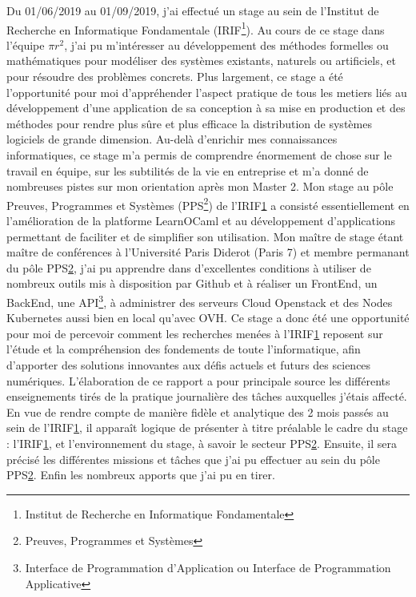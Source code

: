 \documentclass{article}
\begin{document}
Du 01/06/2019 au 01/09/2019, j’ai effectué un stage au sein de l'Institut de Recherche en Informatique Fondamentale (IRIF\footnote{\label{IRIF} Institut de Recherche en Informatique Fondamentale}). Au cours de ce stage dans l'équipe \begin{math}\pi r^2\end{math}, j’ai pu m’intéresser au développement des méthodes formelles ou mathématiques pour modéliser des systèmes existants, naturels ou artificiels, et pour résoudre des problèmes concrets.
Plus largement, ce stage a été l’opportunité pour moi d’appréhender l'aspect pratique de tous les metiers liés au développement d'une application de sa conception à sa mise en production et des méthodes pour rendre plus sûre et plus efficace la distribution de systèmes logiciels de grande dimension.
\newline\newline
Au-delà d’enrichir mes connaissances informatiques, ce stage m’a permis de comprendre énormement de chose sur le travail en équipe, sur les subtilités de la vie en entreprise et m'a donné de nombreuses pistes sur mon orientation après mon Master 2.
Mon stage au pôle Preuves, Programmes et Systèmes (PPS\footnote{\label{PPS} Preuves, Programmes et Systèmes}) de l'IRIF\ref{IRIF} a consisté essentiellement en l'amélioration de la platforme LearnOCaml et au développement d'applications permettant de faciliter et de simplifier son utilisation.
Mon maître de stage étant maître de conférences à l'Université Paris Diderot (Paris 7) et membre permanant du pôle PPS\ref{PPS}, j’ai pu apprendre dans d’excellentes conditions à utiliser de nombreux outils mis à disposition par Github et à réaliser un FrontEnd, un BackEnd, une API\footnote{\label{API} Interface de Programmation d’Application ou Interface de Programmation Applicative}, à administrer des serveurs Cloud Openstack et des Nodes Kubernetes aussi bien en local qu'avec OVH.
\newline\newline
Ce stage a donc été une opportunité pour moi de percevoir comment les recherches menées à l'IRIF\ref{IRIF} reposent sur l’étude et la compréhension des fondements de toute l’informatique, afin d’apporter des solutions innovantes aux défis actuels et futurs des sciences numériques.
L’élaboration de ce rapport a pour principale source les différents enseignements tirés de la pratique journalière des tâches auxquelles j’étais affecté.
\newline\newline
En vue de rendre compte de manière fidèle et analytique des 2 mois passés au sein de l'IRIF\ref{IRIF}, il apparaît logique de présenter à titre préalable le cadre du stage : l'IRIF\ref{IRIF}, et l’environnement du stage, à savoir le secteur PPS\ref{PPS}. Ensuite, il sera précisé les différentes missions et tâches que j’ai pu effectuer au sein du pôle PPS\ref{PPS}. Enfin les nombreux apports que j’ai pu en tirer.
\end{document}

